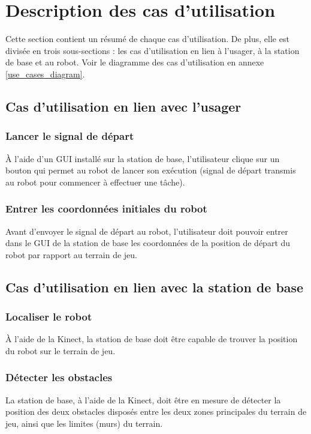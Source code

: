 


\chapter{Description des cas d'utilisation}
\label{s:utilisation}
Cette section contient un résumé de chaque cas d'utilisation. De plus, elle est divisée en trois sous-sections : les cas d'utilisation en lien à l'usager, à la station de base et au robot. 
Voir le diagramme des cas d'utilisation en annexe \ref{use_cases_diagram}.
\section{Cas d'utilisation en lien avec l'usager}
\subsection{Lancer le signal de départ}
À l'aide d'un GUI installé sur la station de base, l'utilisateur clique sur un bouton qui permet au robot de lancer son exécution (signal de départ transmis au robot pour commencer à effectuer une tâche).
\subsection{Entrer les coordonnées initiales du robot}
Avant d'envoyer le signal de départ au robot, l'utilisateur doit pouvoir entrer dans le GUI de la station de base les coordonnées de la position de départ du robot par rapport au terrain de jeu.
\section{Cas d'utilisation en lien avec la station de base}
\subsection{Localiser le robot}
À l'aide de la Kinect, la station de base doit être capable de trouver la position du robot sur le terrain de jeu.
\subsection{Détecter les obstacles}
La station de base, à l'aide de la Kinect, doit être en mesure de détecter la position des deux obstacles disposés entre les deux zones principales du terrain de jeu, ainsi que les limites (murs) du terrain.
